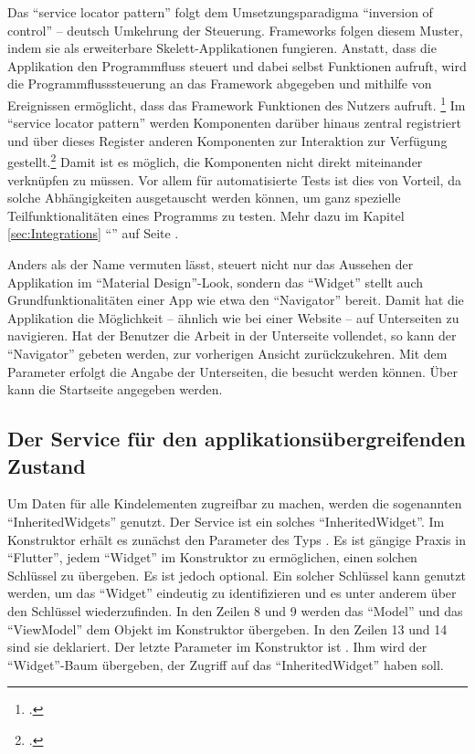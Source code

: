 Das \enquote{service locator pattern} folgt dem Umsetzungsparadigma \enquote{inversion of control} -- deutsch Umkehrung der Steuerung.
Frameworks folgen diesem Muster, indem sie als erweiterbare Skelett-Applikationen fungieren.
Anstatt, dass die Applikation den Programmfluss steuert und dabei selbst Funktionen aufruft, wird die Programmflusssteuerung an das Framework abgegeben und mithilfe von Ereignissen ermöglicht, dass das Framework Funktionen des Nutzers aufruft.
\footcite[Vgl.][]{johnson1988designing}
Im \enquote{service locator pattern} werden Komponenten darüber hinaus zentral registriert und über dieses Register anderen Komponenten zur Interaktion zur Verfügung gestellt.\footcite[Vgl.][]{fowler2004DependencyInjection}
Damit ist es möglich, die Komponenten nicht direkt miteinander verknüpfen zu müssen.
Vor allem für automatisierte Tests ist dies von Vorteil, da solche Abhängigkeiten ausgetauscht werden können, um ganz spezielle Teilfunktionalitäten eines Programms zu testen.
 Mehr dazu im Kapitel \ref{sec:Integrations} \enquote{} auf Seite \pageref{sec:Integrations}.


Anders als der Name vermuten lässt, steuert   nicht nur das Aussehen der Applikation im \enquote{Material Design}-Look,
sondern das \enquote{Widget} stellt auch Grundfunktionalitäten einer App wie etwa den \enquote{Navigator} bereit.
Damit hat die Applikation die Möglichkeit -- ähnlich wie bei einer Website -- auf Unterseiten zu navigieren.
Hat der Benutzer die Arbeit in der Unterseite vollendet, so kann der \enquote{Navigator} gebeten werden, zur vorherigen Ansicht zurückzukehren.
 Mit dem Parameter   erfolgt die Angabe der Unterseiten, die besucht werden können.
Über   kann die Startseite angegeben werden.


\subsection{Der Service für den applikationsübergreifenden Zustand}
\label{sec:ServiceFuerDenApplikationsuebergreifendenZustand}

Um Daten für alle Kindelementen zugreifbar zu machen, werden die sogenannten \enquote{InheritedWidgets} genutzt.
Der Service  \Lst{\ref{lst:Schritt1DerServiceAppState}} ist ein solches \enquote{InheritedWidget}.
Im Konstruktor erhält es zunächst den Parameter des Typs  .
Es ist gängige Praxis in \enquote{Flutter}, jedem \enquote{Widget} im Konstruktor zu ermöglichen, einen solchen Schlüssel zu übergeben.
Es ist jedoch optional.
 Ein solcher Schlüssel kann genutzt werden, um das \enquote{Widget} eindeutig zu identifizieren und es unter anderem über den Schlüssel wiederzufinden.
In den Zeilen 8 und 9 werden das \enquote{Model} und das \enquote{ViewModel} dem Objekt im Konstruktor übergeben.
In den Zeilen 13 und 14 sind sie deklariert.
Der letzte Parameter im Konstruktor ist  .
Ihm wird der \enquote{Widget}-Baum übergeben, der Zugriff auf das \enquote{InheritedWidget} haben soll.

